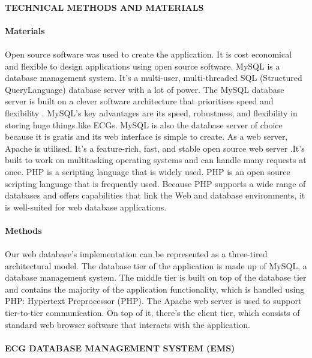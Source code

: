 \documentclass[12pt]{article}
\begin{document}
\paragraph{\textbf{TECHNICAL METHODS AND MATERIALS}}
\paragraph{\textbf{Materials}}
\paragraph{}Open source software was used to create the application. It is cost economical and flexible to design applications using open source software. MySQL is a database management system. It's a multi-user, multi-threaded SQL (Structured QueryLanguage) database server with a lot of power. The MySQL database server is built on a clever software architecture that prioritises speed and flexibility . MySQL's key advantages are its speed, robustness, and flexibility in storing huge things like ECGs. MySQL is also the database server of choice because it is gratis and its web interface is simple to create. As a web server, Apache is utilised. It's a feature-rich, fast, and stable open source web server .It's built to work on multitasking operating systems and can handle many requests at once. PHP is a scripting language that is widely used. PHP is an open source scripting language that is frequently used. Because PHP supports a wide range of databases and offers capabilities that link the Web and database environments, it is well-suited for web database applications.
\paragraph{\textbf{Methods}}
\paragraph{}Our web database's implementation can be represented as a three-tired architectural model. The database tier of the application is made up of MySQL, a database management system. The middle tier is built on top of the database tier and contains the majority of the application functionality, which is handled using PHP: Hypertext Preprocessor (PHP). The Apache web server is used to support tier-to-tier communication. On top of it, there's the client tier, which consists of standard web browser software that interacts with the application.
\paragraph{\textbf{ECG DATABASE MANAGEMENT SYSTEM (EMS)}}
\end{document}

